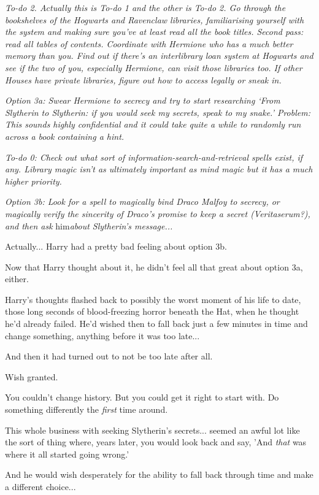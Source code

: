 \emph{To-do 2. Actually this is To-do 1 and the other is To-do 2. Go
through the bookshelves of the Hogwarts and Ravenclaw libraries,
familiarising yourself with the system and making sure you've at least
read all the book titles. Second pass: read all tables of contents.
Coordinate with Hermione who has a much better memory than you. Find out
if there's an interlibrary loan system at Hogwarts and see if the two of
you, especially Hermione, can visit those libraries too. If other Houses
have private libraries, figure out how to access legally or sneak in.}

\emph{Option 3a: Swear Hermione to secrecy and try to start researching
`From Slytherin to Slytherin: if you would seek my secrets, speak to my
snake.' Problem: This sounds highly confidential and it could take quite
a while to randomly run across a book containing a hint.}

\emph{To-do 0: Check out what sort of information-search-and-retrieval
spells exist, if any. Library magic isn't as ultimately important as
mind magic but it has a much higher priority.}

\emph{Option 3b: Look for a spell to magically bind Draco Malfoy to
secrecy, or magically verify the sincerity of Draco's promise to keep a
secret (Veritaserum?), and then ask} him\emph{about Slytherin's
message...}

Actually... Harry had a pretty bad feeling about option 3b.

Now that Harry thought about it, he didn't feel all that great about
option 3a, either.

Harry's thoughts flashed back to possibly the worst moment of his life
to date, those long seconds of blood-freezing horror beneath the Hat,
when he thought he'd already failed. He'd wished then to fall back just
a few minutes in time and change something, anything before it was too
late...

And then it had turned out to not be too late after all.

Wish granted.

You couldn't change history. But you could get it right to start with.
Do something differently the \emph{first} time around.

This whole business with seeking Slytherin's secrets... seemed an
awful lot like the sort of thing where, years later, you would look back
and say, 'And \emph{that} was where it all started going wrong.'

And he would wish desperately for the ability to fall back through time
and make a different choice...

